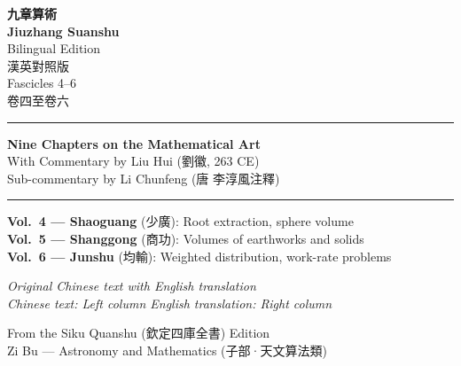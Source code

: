 \documentclass[10pt,a4paper]{article}
\newcommand{\shortline}{\noindent\rule{0.5\textwidth}{0.4pt}\par}
\begin{document}
\begin{titlepage}
\begin{center}
\vspace*{1.5cm}

{\Huge\bfseries\color{titlecolor}
{九章算術}\\[0.4em]
\large Jiuzhang Suanshu}\\[1.5em]

{\LARGE\color{sectioncolor} Bilingual Edition \\ 漢英對照版}\\[1.5em]

{\Large\color{volcolor} Fascicles 4--6 \\ 卷四至卷六}\\[2em]

\shortline

{\large\bfseries Nine Chapters on the Mathematical Art}\\[0.3em]
{\normalsize With Commentary by Liu Hui (劉徽, 263 CE)}\\[0.2em]
{\footnotesize Sub-commentary by Li Chunfeng (唐 李淳風注釋)}\\[1.5em]

\shortline

\vspace{0.8cm}

\begin{minipage}{0.9\textwidth}
\centering
\textbf{Vol.\ 4 — Shaoguang} (少廣): Root extraction, sphere volume\\[0.2em]
\textbf{Vol.\ 5 — Shanggong} (商功): Volumes of earthworks and solids\\[0.2em]
\textbf{Vol.\ 6 — Junshu} (均輸): Weighted distribution, work-rate problems
\end{minipage}

\vspace{1.5cm}

{\small\textit{Original Chinese text with English translation}}\\[0.3em]
{\small\textit{Chinese text: Left column \quad English translation: Right column}}

\vfill

{\footnotesize From the Siku Quanshu (欽定四庫全書) Edition}\\
{\footnotesize Zi Bu — Astronomy and Mathematics (子部·天文算法類)}

\end{center}
\end{titlepage}
\end{document}
